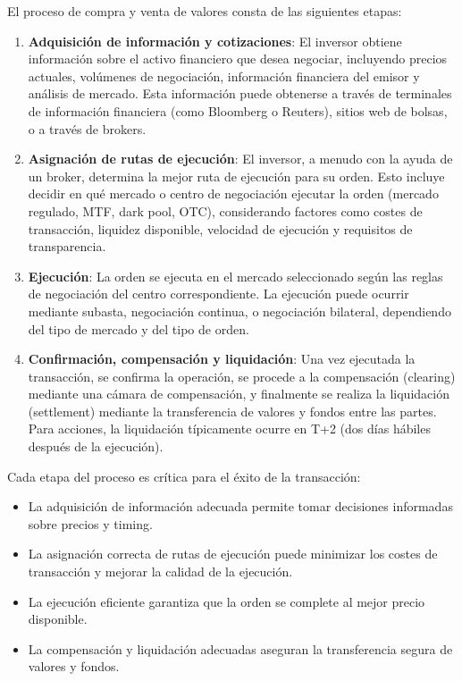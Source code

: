 \begin{teorema}
El proceso de compra y venta de valores consta de las siguientes etapas:

\begin{enumerate}
\item \textbf{Adquisición de información y cotizaciones}: El inversor obtiene información sobre el activo financiero que desea negociar, incluyendo precios actuales, volúmenes de negociación, información financiera del emisor y análisis de mercado. Esta información puede obtenerse a través de terminales de información financiera (como Bloomberg o Reuters), sitios web de bolsas, o a través de brokers.

\item \textbf{Asignación de rutas de ejecución}: El inversor, a menudo con la ayuda de un broker, determina la mejor ruta de ejecución para su orden. Esto incluye decidir en qué mercado o centro de negociación ejecutar la orden (mercado regulado, MTF, dark pool, OTC), considerando factores como costes de transacción, liquidez disponible, velocidad de ejecución y requisitos de transparencia.

\item \textbf{Ejecución}: La orden se ejecuta en el mercado seleccionado según las reglas de negociación del centro correspondiente. La ejecución puede ocurrir mediante subasta, negociación continua, o negociación bilateral, dependiendo del tipo de mercado y del tipo de orden.

\item \textbf{Confirmación, compensación y liquidación}: Una vez ejecutada la transacción, se confirma la operación, se procede a la compensación (clearing) mediante una cámara de compensación, y finalmente se realiza la liquidación (settlement) mediante la transferencia de valores y fondos entre las partes. Para acciones, la liquidación típicamente ocurre en T+2 (dos días hábiles después de la ejecución).
\end{enumerate}
\end{teorema}

\begin{proposicion}
Cada etapa del proceso es crítica para el éxito de la transacción:
\begin{itemize}
\item La adquisición de información adecuada permite tomar decisiones informadas sobre precios y timing.
\item La asignación correcta de rutas de ejecución puede minimizar los costes de transacción y mejorar la calidad de la ejecución.
\item La ejecución eficiente garantiza que la orden se complete al mejor precio disponible.
\item La compensación y liquidación adecuadas aseguran la transferencia segura de valores y fondos.
\end{itemize}
\end{proposicion}

